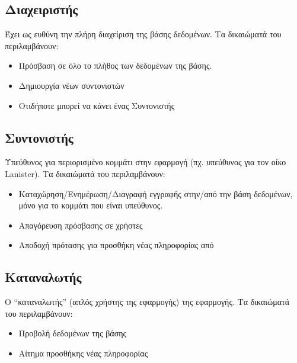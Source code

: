 \documentclass[../main.tex]{subfiles}
\begin{document}
\subsection{Διαχειριστής}
Έχει ως ευθύνη την πλήρη διαχείριση της βάσης δεδομένων. Τα δικαιώματά του
περιλαμβάνουν: 

\begin{itemize}
  \item Πρόσβαση σε όλο το πλήθος των δεδομένων της βάσης. 
  \item Δημιουργία νέων συντονιστών 
  \item Οτιδήποτε μπορεί να κάνει ένας Συντονιστής
\end{itemize}

\subsection{Συντονιστής}
Υπεύθυνος για περιορισμένο κομμάτι στην εφαρμογή (πχ. υπεύθυνος για τον οίκο
Lanister). Τα δικαιώματά του περιλαμβάνουν: 

\begin{itemize}
  \item Καταχώρηση/Ενημέρωση/Διαγραφή εγγραφής στην/από την βάση δεδομένων, μόνο για το κομμάτι που είναι υπεύθυνος. 
  \item Απαγόρευση πρόσβασης σε χρήστες 
  \item Αποδοχή πρότασης για προσθήκη νέας πληροφορίας από
\end{itemize}

\subsection{Καταναλωτής}
Ο “καταναλωτής” (απλός χρήστης της εφαρμογής) της εφαρμογής. Τα δικαιώματά του
περιλαμβάνουν: 

\begin{itemize}
  \item Προβολή δεδομένων της βάσης 
  \item Αίτημα προσθήκης νέας πληροφορίας
\end{itemize}
\end{document}

